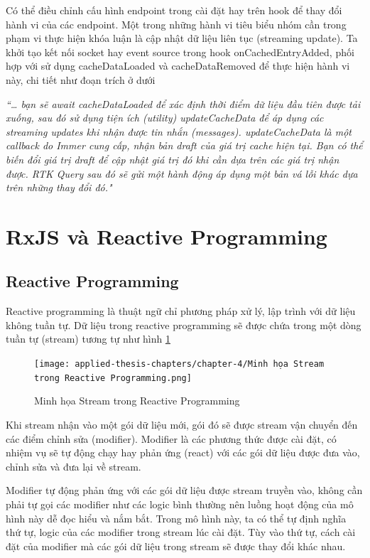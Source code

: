 Có thể điều chỉnh cấu hình endpoint trong cài đặt hay trên hook để thay đổi hành vi của các endpoint.
Một trong những hành vi tiêu biểu nhóm cần trong phạm vi thực hiện khóa luận là cập nhật dữ liệu liên tục (streaming update).
Ta khởi tạo kết nối socket hay event source trong hook onCachedEntryAdded, phối hợp với sử dụng cacheDataLoaded và cacheDataRemoved để thực hiện hành vi này, chi tiết như đoạn trích ở dưới
\par

\textit{“… bạn sẽ await cacheDataLoaded để xác định thời điểm dữ liệu đầu tiên được tải xuống, sau đó sử dụng tiện ích (utility) updateCacheData để áp dụng các streaming updates khi nhận được tin nhắn (messages).
  updateCacheData là một callback do Immer cung cấp, nhận bản draft của giá trị cache hiện tại.
  Bạn có thể biến đổi giá trị draft để cập nhật giá trị đó khi cần dựa trên các giá trị nhận được.
  RTK Query sau đó sẽ gửi một hành động áp dụng một bản vá lỗi khác dựa trên những thay đổi đó."} \cite{chap4bib3}

\section{RxJS và Reactive Programming}

\subsection{Reactive Programming}

\tab Reactive programming là thuật ngữ chỉ phương pháp xử lý, lập trình với dữ liệu không tuần tự.
Dữ liệu trong reactive programming sẽ được chứa trong một dòng tuần tự (stream) tương tự như hình \ref{fig:StreamInRP}

\begin{figure}[H]
  \centering
  \texttt{[image: applied-thesis-chapters/chapter-4/Minh họa Stream trong Reactive Programming.png]}
  \caption{Minh họa Stream trong Reactive Programming \cite{chap4bib4}}
  \label{fig:StreamInRP}
\end{figure}

\tab Khi stream nhận vào một gói dữ liệu mới, gói đó sẽ được stream vận chuyển đến các điểm chỉnh sửa (modifier).
Modifier là các phương thức được cài đặt, có nhiệm vụ sẽ tự động chạy hay phản ứng (react) với các gói dữ liệu được đưa vào, chỉnh sửa và đưa lại về stream.
\par

Modifier tự động phản ứng với các gói dữ liệu được stream truyền vào, không cần phải tự gọi các modifier như các logic bình thường nên luồng hoạt động của mô hình này dễ đọc hiểu và nắm bắt.
Trong mô hình này, ta có thể tự định nghĩa thứ tự, logic của các modifier trong stream lúc cài đặt.
Tùy vào thứ tự, cách cài đặt của modifier mà các gói dữ liệu trong stream sẽ được thay đổi khác nhau.

